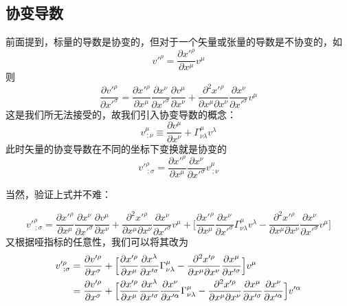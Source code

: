 \documentclass[a4paper]{book}
\makeatletter
\renewcommand{\proofname}{\indent\bf 证明}%
\renewenvironment{proof}[1][\proofname]{\par
	\pushQED{\qed}%
	\normalfont \topsep6\p@\@plus6\p@\relax
	\trivlist
	\item[\hskip\labelsep
	\itshape
	#1\@addpunct{}]\ignorespaces
}{%
	\popQED\endtrivlist\@endpefalse
}
\makeatother
\begin{document}
\begin{appendix}
\section{协变导数}
前面提到，标量的导数是协变的，但对于一个矢量或张量的导数是不协变的，如
\begin{equation}
	v'^{\rho}=\frac{\partial x'^{\rho}}{\partial x^{\mu}}v^{\mu}
\end{equation}
则
\begin{equation}
	\frac{\partial v'^{\rho}}{\partial x'^{\sigma}}=\frac{\partial x'^{\rho}}{\partial x^\mu}\frac{\partial x^{\nu}}{\partial x'^\sigma}\frac{\partial v^{\mu}}{\partial x^\nu}+\frac{\partial ^2 x'^{\rho}}{\partial x^{\mu} \partial x^{\nu}} \frac{\partial x^{\nu}}{\partial x'^{\sigma}}v^{\mu}
\end{equation}
这是我们所无法接受的，故我们引入协变导数的概念：
\begin{equation}
	v^{\mu}_{~;\nu}\equiv \frac{\partial v^{\mu}}{\partial x^{\nu}}+\Gamma^{\mu}_{\nu \lambda}v^{\lambda}
\end{equation}
此时矢量的协变导数在不同的坐标下变换就是协变的
\begin{equation}
	v'^{\rho}_{~;\sigma}=\frac{\partial x'^{\rho}}{\partial x^{\mu}} \frac{\partial x^{\nu}}{\partial x'^{\sigma}}v^{\mu}_{~;\nu}
\end{equation}\par 
当然，验证上式并不难：
\begin{proof}
\begin{equation}
v'^{\rho}_{~;\sigma}=\frac{\partial x'^{\rho}}{\partial x^{\mu}}\frac{\partial x^{\nu}}{\partial x'^\sigma}\frac{\partial v^{\mu}}{\partial x^\nu}+\frac{\partial ^2 x'^{\rho}}{\partial x^{\mu} \partial x^{\nu}} \frac{\partial x^{\nu}}{\partial x'^{\sigma}}v^{\mu}+\Big[\frac{\partial x'^{\rho}}{\partial x^{\mu}}\frac{\partial x^{\nu}}{\partial x'^\sigma}\Gamma^{\mu}_{\nu \lambda}v^{\lambda}-\frac{\partial ^2 x'^{\rho}}{\partial x^{\mu} \partial x^{\nu}} \frac{\partial x^{\nu}}{\partial x'^{\sigma}}v^{\mu}\Big]
\end{equation}
又根据哑指标的任意性，我们可以将其改为
\begin{align}
v'^{\rho}_{~;\sigma}={}&\frac{\partial v'^{\rho}}{\partial x^\sigma}+\Big[\frac{\partial x'^{\rho}}{\partial x^{\mu}}\frac{\partial x^{\lambda}}{\partial x'^\sigma}\Gamma^{\mu}_{\nu \lambda}-\frac{\partial ^2 x'^{\rho}}{\partial x^{\mu} \partial x^{\nu}} \frac{\partial x^{\mu}}{\partial x'^{\sigma}}\Big]v^{\mu}\notag \\ 
={}& \frac{\partial v'^{\rho}}{\partial x^\sigma}+\Big[\frac{\partial x'^{\rho}}{\partial x^{\mu}}\frac{\partial x^{\lambda}}{\partial x'^\sigma}\frac{\partial x^{\nu}}{\partial x'^{\alpha}}\Gamma^{\mu}_{\nu \lambda}-\frac{\partial ^2 x'^{\rho}}{\partial x^{\mu} \partial x^{\nu}} \frac{\partial x^{\mu}}{\partial x'^{\sigma}}\frac{\partial x^{\nu}}{\partial x'^{\alpha}}\Big]v'^{\alpha} \notag \\ 

\end{align}
\end{proof}
\end{appendix}
\end{document}
